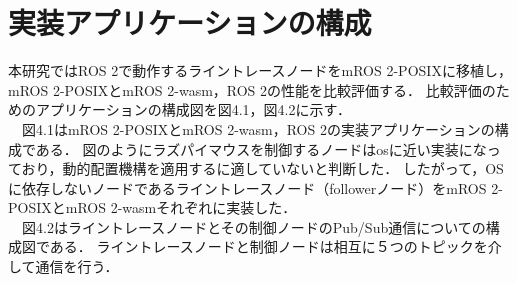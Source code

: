 \section{実装アプリケーションの構成}
本研究ではROS 2で動作するライントレースノードをmROS 2-POSIXに移植し，mROS 2-POSIXとmROS 2-wasm，ROS 2の性能を比較評価する．
比較評価のためのアプリケーションの構成図を図4.1，図4.2に示す．
\\　図4.1はmROS 2-POSIXとmROS 2-wasm，ROS 2の実装アプリケーションの構成である．
図のようにラズパイマウスを制御するノードはosに近い実装になっており，動的配置機構を適用するに適していないと判断した．
したがって，OSに依存しないノードであるライントレースノード（followerノード）をmROS 2-POSIXとmROS 2-wasmそれぞれに実装した．
\\　図4.2はライントレースノードとその制御ノードのPub/Sub通信についての構成図である．
ライントレースノードと制御ノードは相互に５つのトピックを介して通信を行う．
